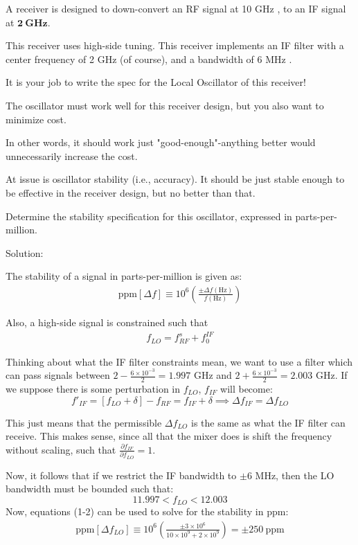 \begin{homeworkProblem}
A receiver is designed to down-convert an RF signal at 10 GHz , to an IF signal at $\mathbf{2 ~ G H z}$.

This receiver uses high-side tuning.
This receiver implements an IF filter with a center frequency of 2 GHz (of course), and a bandwidth of 6 MHz .

It is your job to write the spec for the Local Oscillator of this receiver!

The oscillator must work well for this receiver design, but you also want to minimize cost.

In other words, it should work just "good-enough"-anything better would unnecessarily increase the cost.

At issue is oscillator stability (i.e., accuracy). It should be just stable enough to be effective in the receiver design, but no better than that.

Determine the stability specification for this oscillator, expressed in parts-per-million.

\begin{callout}{Solution:}

The stability of a signal in parts-per-million is given as:
\begin{align}
    \text{ppm}[\Delta f] \equiv 10^{6} \left( \frac{\pm \Delta f(\mathrm{Hz})}{f(\mathrm{Hz})} \right)
\end{align}

Also, a high-side signal is constrained such that 
\begin{align}
    f_{LO}=f_{RF}^{s}+f_{0}^{IF}
\end{align}

Thinking about what the IF filter constraints mean, we want to use a filter which can pass signals between $2 - \frac{6 \times10^{-3}}{2} = 1.997$ GHz and $2 + \frac{6\times10^{-3}}{2} = 2.003$ GHz.
If we suppose there is some perturbation in $f_{LO}$, $f_{IF}$ will become:
$$f'_{IF} = [f_{LO} + \delta]-f_{RF} = f_{IF}+\delta \implies \Delta f_{IF} = \Delta f_{LO}$$

This just means that the permissible $\Delta f_{LO}$ is the same as what the IF filter can receive. This makes sense, since all that the mixer does is shift the frequency without scaling, such that $\frac{\partial f_{IF}}{\partial f_{LO}} = 1$.

Now, it follows that if we restrict the IF bandwidth to $\pm6$ MHz, then the LO bandwidth must be bounded such that:
    $$11.997 < f_{LO} < 12.003$$
Now, equations (1-2) can be used to solve for the stability in ppm:
\begin{align*}
    \text{ppm}[\Delta f_{LO}] \equiv 10^{6} \left( \frac{\pm 3\times10^{6}}{10\times10^9 + 2\times10^9} \right) = \pm 250\mathrm{~ppm}
\end{align*}
\end{callout}

\end{homeworkProblem}

